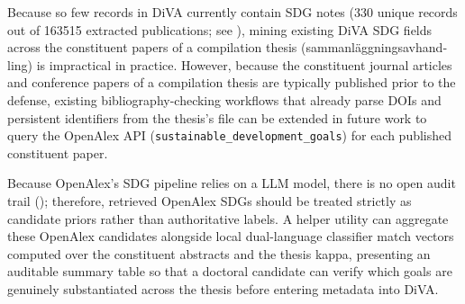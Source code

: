 \begin{recommendation}
\label{rec:openAlexCompilationTheses}
Because so few records in \gls{DiVA} currently contain \gls{SDG} notes (\num{330} unique records out of \num{163515} extracted publications; see ), mining existing \gls{DiVA} \gls{SDG} fields across the constituent papers of a compilation thesis (\foreignlanguage{swedish}{sammanläggningsavhandling}) is impractical in practice. However, because the constituent journal articles and conference papers of a compilation thesis are typically published prior to the defense, existing bibliography-checking workflows that already parse \glspl{DOI} and persistent identifiers from the thesis's  file can be extended in future work to query the OpenAlex \gls{API} (\texttt{sustainable\_development\_goals}) for each published constituent paper.
\medskip

Because OpenAlex's \gls{SDG} pipeline relies on a \gls{LLM} model, there is no open audit trail (); therefore, retrieved OpenAlex \glspl{SDG} should be treated strictly as candidate priors rather than authoritative labels. A helper utility can aggregate these OpenAlex candidates alongside local dual-language classifier match vectors computed over the constituent abstracts and the thesis \foreignlanguage{swedish}{kappa}, presenting an auditable summary table so that a doctoral candidate can verify which goals are genuinely substantiated across the thesis before entering metadata into \gls{DiVA}.
\end{recommendation}

